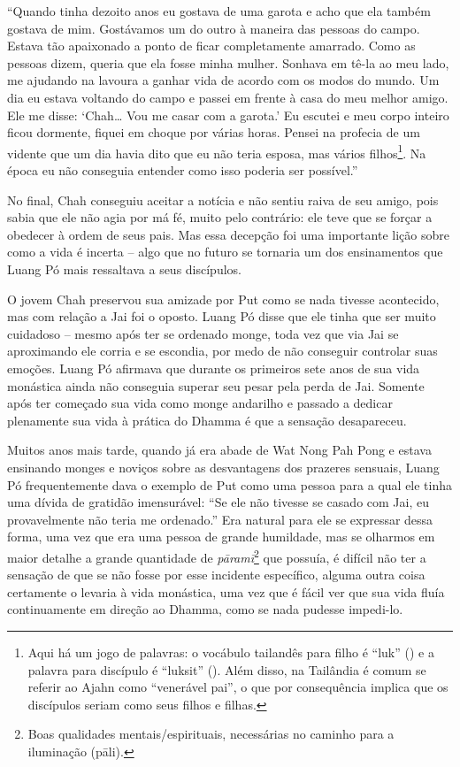 ``Quando tinha dezoito anos eu gostava de uma garota e acho que ela
também gostava de mim. Gostávamos um do outro à maneira das pessoas do
campo. Estava tão apaixonado a ponto de ficar completamente amarrado.
Como as pessoas dizem, queria que ela fosse minha mulher. Sonhava em
tê-la ao meu lado, me ajudando na lavoura a ganhar vida de acordo com os
modos do mundo. Um dia eu estava voltando do campo e passei em frente à
casa do meu melhor amigo. Ele me disse: `Chah\ldots{} Vou me casar com a
garota.' Eu escutei e meu corpo inteiro ficou dormente, fiquei em choque
por várias horas. Pensei na profecia de um vidente que um dia havia dito
que eu não teria esposa, mas vários filhos\footnote{Aqui há um jogo de
  palavras: o vocábulo tailandês para filho é ``luk'' () e a palavra
  para discípulo é ``luksit'' (). Além disso, na Tailândia é
  comum se referir ao Ajahn como ``venerável pai'', o que por
  consequência implica que os discípulos seriam como seus filhos e
  filhas.}. Na época eu não conseguia entender como isso poderia ser
possível.''

No final, Chah conseguiu aceitar a notícia e não sentiu raiva de seu
amigo, pois sabia que ele não agia por má fé, muito pelo contrário: ele
teve que se forçar a obedecer à ordem de seus pais. Mas essa decepção
foi uma importante lição sobre como a vida é incerta -- algo que no
futuro se tornaria um dos ensinamentos que Luang Pó mais ressaltava a
seus discípulos.

O jovem Chah preservou sua amizade por Put como se nada tivesse
acontecido, mas com relação a Jai foi o oposto. Luang Pó disse que ele
tinha que ser muito cuidadoso -- mesmo após ter se ordenado monge, toda
vez que via Jai se aproximando ele corria e se escondia, por medo de não
conseguir controlar suas emoções. Luang Pó afirmava que durante os
primeiros sete anos de sua vida monástica ainda não conseguia superar
seu pesar pela perda de Jai. Somente após ter começado sua vida como
monge andarilho e passado a dedicar plenamente sua vida à prática do
Dhamma é que a sensação desapareceu.

Muitos anos mais tarde, quando já era abade de Wat Nong Pah Pong e
estava ensinando monges e noviços sobre as desvantagens dos prazeres
sensuais, Luang Pó frequentemente dava o exemplo de Put como uma pessoa
para a qual ele tinha uma dívida de gratidão imensurável: ``Se ele não
tivesse se casado com Jai, eu provavelmente não teria me ordenado.'' Era
natural para ele se expressar dessa forma, uma vez que era uma pessoa de
grande humildade, mas se olharmos em maior detalhe a grande quantidade
de \emph{pāramī}\footnote{Boas qualidades mentais/espirituais,
  necessárias no caminho para a iluminação (pāli).} que possuía, é
difícil não ter a sensação de que se não fosse por esse incidente
específico, alguma outra coisa certamente o levaria à vida monástica,
uma vez que é fácil ver que sua vida fluía continuamente em direção ao
Dhamma, como se nada pudesse impedi-lo.

